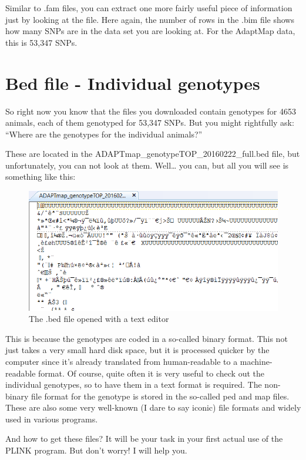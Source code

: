 \documentclass[]{book}
\begin{document}
Similar to .fam files, you can extract one more fairly useful piece of
information just by looking at the file. Here again, the number of rows
in the .bim file shows how many SNPs are in the data set you are looking
at. For the AdaptMap data, this is 53,347 SNPs.

\section{Bed file - Individual
genotypes}\label{bed-file---individual-genotypes}

So right now you know that the files you downloaded contain genotypes
for 4653 animals, each of them genotyped for 53,347 SNPs. But you might
rightfully ask: ``Where are the genotypes for the individual animals?''

These are located in the ADAPTmap\_genotypeTOP\_20160222\_full.bed file,
but unfortunately, you can not look at them. Well\ldots{} you can, but
all you will see is something like this:

\begin{figure}
\includegraphics[width=9.35in]{images/6-4-AdaptMapBedFile} \caption{The .bed file opened with a text editor}\label{fig:fig6-4}
\end{figure}

This is because the genotypes are coded in a so-called binary format.
This not just takes a very small hard disk space, but it is processed
quicker by the computer since it's already translated from
human-readable to a machine-readable format. Of course, quite often it
is very useful to check out the individual genotypes, so to have them in
a text format is required. The non-binary file format for the genotype
is stored in the so-called ped and map files. These are also some very
well-known (I dare to say iconic) file formats and widely used in
various programs.

And how to get these files? It will be your task in your first actual
use of the PLINK program. But don't worry! I will help you.
\end{document}
